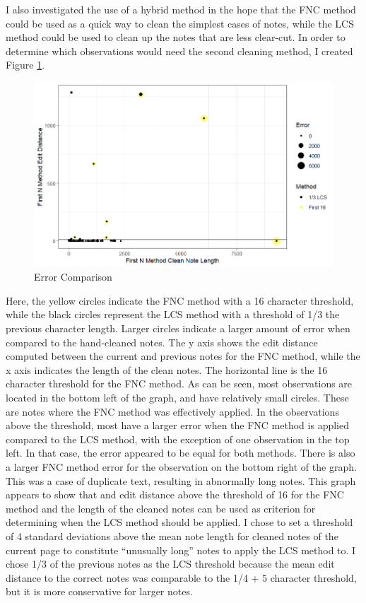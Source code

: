 \documentclass[print]{nuthesis}
\begin{document}
I also investigated the use of a hybrid method in the hope that the FNC method could be used as a quick way to clean the simplest cases of notes, while the LCS method could be used to clean up the notes that are less clear-cut.
In order to determine which observations would need the second cleaning method, I created Figure \ref{fig:errorplot}.

\begin{figure}

{\centering \includegraphics[width=\linewidth]{images/cleaningerror} 

}

\caption{Error Comparison}\label{fig:errorplot}
\end{figure}

Here, the yellow circles indicate the FNC method with a 16 character threshold, while the black circles represent the LCS method with a threshold of 1/3 the previous character length.
Larger circles indicate a larger amount of error when compared to the hand-cleaned notes.
The y axis shows the edit distance computed between the current and previous notes for the FNC method, while the x axis indicates the length of the clean notes.
The horizontal line is the 16 character threshold for the FNC method.
As can be seen, most observations are located in the bottom left of the graph, and have relatively small circles.
These are notes where the FNC method was effectively applied.
In the observations above the threshold, most have a larger error when the FNC method is applied compared to the LCS method, with the exception of one observation in the top left.
In that case, the error appeared to be equal for both methods.
There is also a larger FNC method error for the observation on the bottom right of the graph.
This was a case of duplicate text, resulting in abnormally long notes.
This graph appears to show that and edit distance above the threshold of 16 for the FNC method and the length of the cleaned notes can be used as criterion for determining when the LCS method should be applied.
I chose to set a threshold of 4 standard deviations above the mean note length for cleaned notes of the current page to constitute ``unusually long'' notes to apply the LCS method to.
I chose 1/3 of the previous notes as the LCS threshold because the mean edit distance to the correct notes was comparable to the 1/4 + 5 character threshold, but it is more conservative for larger notes.
\end{document}
